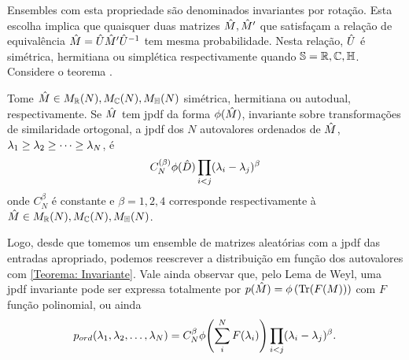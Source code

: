 Ensembles com esta propriedade são denominados invariantes por rotação. Esta escolha implica que quaisquer duas matrizes $\hat M, \hat M'$ que satisfaçam a relação de equivalência $\hat M = \hat U \hat M' \hat U^{-1}$ tem mesma probabilidade. Nesta relação, $\hat U$ é simétrica, hermitiana ou simplética respectivamente quando $\mathbb{S} = \mathbb{R},\mathbb{C},\mathbb{H} $. Considere o teorema \cite[Capítulo~3]{AlanThesis}.
\begin{thm}
	Tome $\hat M \in M_{\mathbb{R}}(N),  M_{\mathbb{C}}(N),  M_{\mathbb{H}}(N)$ simétrica, hermitiana ou autodual, respectivamente. Se  $\hat M$ tem jpdf da forma $\phi(\hat M)$, invariante sobre transformações de similaridade ortogonal, a jpdf dos $N$ autovalores ordenados de $\hat M$, $\lambda_1 \geq \lambda_2 \geq \dots \geq \lambda_N$, é $$ C_{N}^{(\beta)} \phi(\hat D) \prod_{i < j} (\lambda_i - \lambda_j)^{\beta}$$ onde $C_{N}^{\beta}$ é constante e $\beta = 1, 2, 4$ corresponde respectivamente à $\hat M \in M_{\mathbb{R}}(N),  M_{\mathbb{C}}(N),  M_{\mathbb{H}}(N)$. 
	\label{Teorema: Invariante}
\end{thm}

Logo, desde que tomemos um ensemble de matrizes aleatórias com a jpdf das entradas apropriado, podemos reescrever a distribuição em função dos autovalores com \ref{Teorema: Invariante}. Vale ainda observar que, pelo Lema de Weyl, uma jpdf invariante pode ser expressa totalmente por $p(\hat M)= \phi \left(\Tr(F(M)) \right)$ com $F$ função polinomial, ou ainda
\begin{equation}
	p_{ord}(\lambda_1, \lambda_2, \dots, \lambda_N) = C_{N}^{\beta} \phi{\left( \sum_i^N F(\lambda_i) \right)} \prod_{i < j} (\lambda_i - \lambda_j)^{\beta}.
	\label{Equation: p-ord}
\end{equation}


